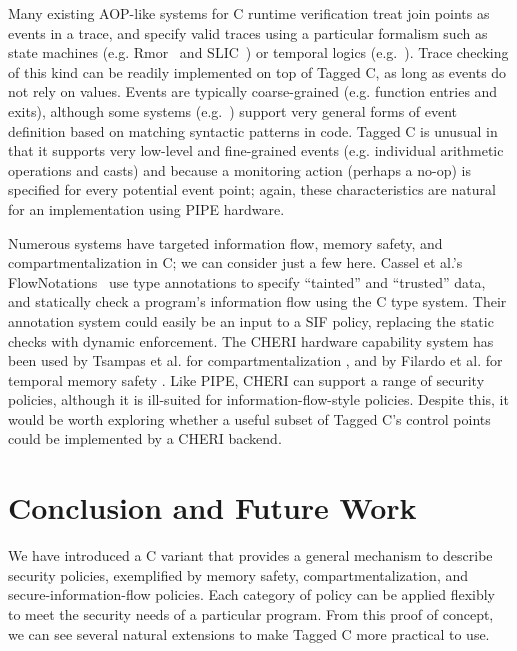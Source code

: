 \documentclass{llncs}
\begin{document}
Many existing AOP-like systems for C runtime verification treat join points as events in a trace, and specify
valid traces using a particular formalism such as state machines (e.g. {\sc Rmor}~\cite{Havelund08:RVC} and SLIC~\cite{Ball02:slic})
or temporal logics (e.g.~\cite{Chabot+15}).
Trace checking of this kind can be readily implemented on top of Tagged C, as long as events do not rely on values.
Events are typically coarse-grained (e.g. function entries and exits), although some systems (e.g.~\cite{engler2000checking})
support very general forms of event definition based on matching syntactic patterns in code. 
Tagged C is unusual in that it supports very low-level and fine-grained events (e.g. individual
arithmetic operations and casts) and because a monitoring action (perhaps a no-op) is specified for every potential event point;
again, these characteristics are natural for an implementation using PIPE hardware.

Numerous systems have targeted information flow, memory safety, and compartmentalization in C; we can consider just a few here.
Cassel et al.'s FlowNotations~\cite{Cassel19:FlowNotation} use type annotations to specify ``tainted'' and ``trusted'' data,
and statically check a program's information flow using the C type system. Their annotation system
could easily be an input to a SIF policy, replacing the static checks with dynamic enforcement.
The CHERI hardware capability system has been used by Tsampas et al. for compartmentalization
\cite{Tsampas2017:TowardsAC}, and by Filardo et al. for temporal memory safety
\cite{NWF20:Cornucopia}. Like PIPE, CHERI can support a range of security policies,
although it is ill-suited for information-flow-style policies. Despite this, it would
be worth exploring whether a useful subset of Tagged C's control points could be implemented
by a CHERI backend.

\section{Conclusion and Future Work}
\label{sec:conclusion}

We have introduced a C variant that provides a general mechanism to describe security
policies, exemplified by memory safety, compartmentalization, and secure-information-flow
policies. Each category of policy can be applied flexibly to meet the security needs of
a particular program. From this proof of concept, we can see several natural extensions
to make Tagged C more practical to use.
\end{document}
